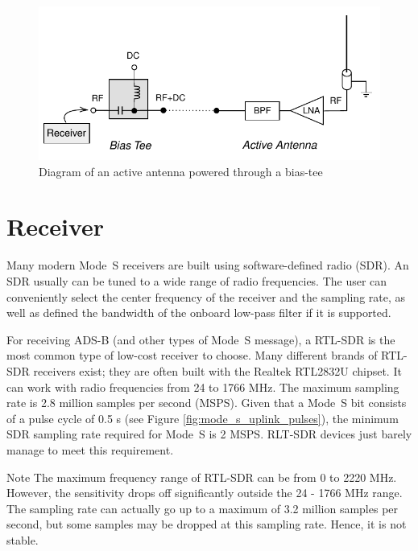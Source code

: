 \begin{figure}[ht]
  \centering
  \includegraphics[scale=0.9]{figures/quickstart/biastee_active_antenna.pdf}
  \caption{Diagram of an active antenna powered through a bias-tee}
  \label{fig:biastee_active_antenna}
\end{figure}


\section{Receiver}

Many modern Mode~S receivers are built using software-defined radio (SDR). An SDR usually can be tuned to a wide range of radio frequencies. The user can conveniently select the center frequency of the receiver and the sampling rate, as well as defined the bandwidth of the onboard low-pass filter if it is supported.

For receiving ADS-B (and other types of Mode~S message), a RTL-SDR is the most common type of low-cost receiver to choose. Many different brands of RTL-SDR receivers exist; they are often built with the Realtek RTL2832U chipset. It can work with radio frequencies from 24 to 1766 MHz. The maximum sampling rate is 2.8 million samples per second (MSPS). Given that a Mode~S bit consists of a pulse cycle of 0.5 {\textmu}s (see Figure \ref{fig:mode_s_uplink_pulses}), the minimum SDR sampling rate required for Mode~S is 2 MSPS. RLT-SDR devices just barely manage to meet this requirement.

\begin{notebox}{Note}
  The maximum frequency range of RTL-SDR can be from 0 to 2220 MHz. However, the sensitivity drops off significantly outside the 24 - 1766 MHz range. The sampling rate can actually go up to a maximum of 3.2 million samples per second, but some samples may be dropped at this sampling rate. Hence, it is not stable.
\end{notebox}

